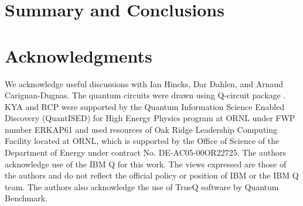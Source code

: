 \section{Summary and Conclusions}


\section{Acknowledgments}


We acknowledge useful discussions with Ian Hincks, Dar Dahlen, and Arnaud Carignan-Dugnas. The quantum circuits were drawn using Q-circuit package \cite{QCircuit}.
KYA and RCP were supported by the Quantum Information Science Enabled Discovery (QuantISED) for High Energy Physics program at ORNL under FWP number ERKAP61 and used resources of Oak Ridge Leadership Computing Facility located at ORNL, which is supported by the Office of Science of the Department of Energy under contract No. DE-AC05-00OR22725.
 The authors acknowledge use of the IBM Q for this work. The views expressed are those of the authors and do not reflect the official policy or position of IBM or the IBM Q team. The authors also acknowledge the use of TrueQ software by Quantum Benchmark.